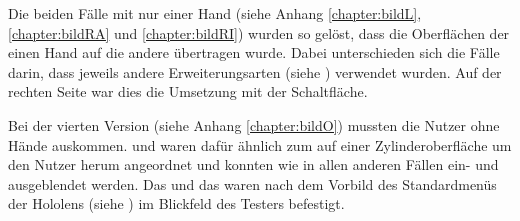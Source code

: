 			Die beiden Fälle mit nur einer Hand (siehe Anhang \ref{chapter:bildL}, \ref{chapter:bildRA} und \ref{chapter:bildRI}) wurden so gelöst, dass die Oberflächen der einen Hand auf die andere übertragen wurde. Dabei unterschieden sich die Fälle darin, dass jeweils andere Erweiterungsarten (siehe ) verwendet wurden. Auf der rechten Seite war dies die Umsetzung mit der Schaltfläche.
			
			Bei der vierten Version (siehe Anhang \ref{chapter:bildO}) mussten die Nutzer ohne Hände auskommen.  und  waren dafür ähnlich zum  auf einer Zylinderoberfläche um den Nutzer herum angeordnet und konnten wie in allen anderen Fällen ein- und ausgeblendet werden. Das  und das  waren nach dem Vorbild des Standardmenüs der Hololens (siehe ) im Blickfeld des Testers befestigt. 
			
		